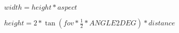 \documentclass{article}
\begin{document}
$ width = height * aspect $
\pagebreak

$ height = 2 * \tan( fov * \frac{1}{2} * ANGLE2DEG ) * distance $
\pagebreak
\end{document}
